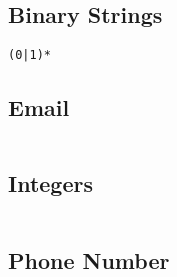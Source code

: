 \subsection{Binary Strings}
\begin{verbatim}
(0|1)*
\end{verbatim}
\subsection{Email}
\begin{verbatim}
\end{verbatim}
\subsection{Integers}
\begin{verbatim}
\end{verbatim}
\subsection{Phone Number}
\begin{verbatim}
\end{verbatim}